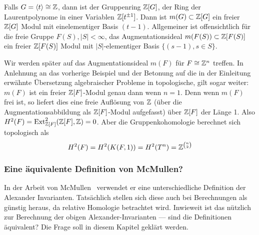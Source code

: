 \begin{bsp}
	Falls $G=\langle t \rangle \cong \mathbb{Z}$, dann ist der Gruppenring $\mathbb{Z} [G]$, der Ring der Laurentpolynome in einer Variablen $\mathbb{Z}[t^{\pm 1}]$. Dann ist $m(G) \subset \mathbb{Z}[G]$ ein freier $\mathbb{Z}[G]$ Modul mit einelementiger Basis $(t-1)$. Allgemeiner ist offensichtlich für die freie Gruppe $F(S), |S| < \infty$, das Augmentationsideal $m(F(S)) \subset \mathbb{Z}[F(S)]$ ein freier $\mathbb{Z}[F(S)]$ Modul mit $|S|$-elementiger Basis $\{(s-1), s \in S\}$.
\end{bsp}

\begin{bsp}
	\label{ex:eilmaclane}
	Wir werden später auf das Augmentationsideal $m(F)$ für $F\cong \mathbb{Z}^n$ treffen. In Anlehnung an das vorherige Beispiel und der Betonung auf die in der Einleitung erwähnte Übersetzung algebraischer Probleme in topologische, gilt sogar weiter: $m(F)$ ist ein freier $\mathbb{Z}[F]$-Modul genau dann wenn $n=1$. Denn wenn $m(F)$ frei ist, so liefert dies eine freie Auflösung von $\mathbb{Z}$ (über die Augmentationsabbildung als $\mathbb{Z}[F]$-Modul aufgefasst) über $\mathbb{Z}[F]$ der Länge 1. Also $H^2(F) = \operatorname{Ext}^2_{\mathbb{Z}[F]}(\mathbb{Z} [F],\mathbb{Z})=0$. Aber die Gruppenkohomologie berechnet sich topologisch als 
	\[
	H^2(F)=H^2(K(F,1))=H^2(T^n)=\mathbb{Z}^{\binom n2}		
	\]
\end{bsp}



\subsubsection{Eine äquivalente Definition von McMullen?}
    
In der Arbeit von McMullen~\cite{MCMULLEN.2002} verwendet er eine unterschiedliche Definition der Alexander Invarianten. Tatsächlich stellen sich diese auch bei Berechnungen als günstig heraus, da relative Homologie betrachtet wird. Inwieweit ist das nützlich zur Berechnung der obigen Alexander-Invarianten --- sind die Definitionen äquivalent? Die Frage soll in diesem Kapitel geklärt werden.

